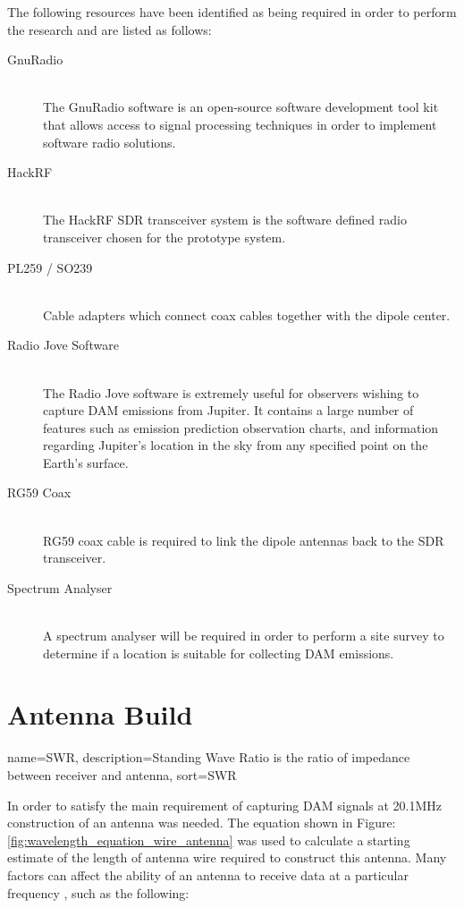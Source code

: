 \documentclass[runningheads,a4paper]{llncs}
\begin{document}
The following resources have been identified as being required in order to perform the research and are listed as follows:

\begin{description}
  \item[GnuRadio] \hfill \\
  The GnuRadio software is an open-source software development tool kit that allows access to signal processing techniques in order to implement software radio solutions.
  \item[HackRF] \hfill \\
  The HackRF \gls{SDR} transceiver system is the software defined radio transceiver chosen for the prototype system.
  \item[PL259 / SO239] \hfill \\
  Cable adapters which connect coax cables together with the dipole center.
  \item[Radio Jove Software] \hfill \\
  The Radio Jove software is extremely useful for observers wishing to capture \gls{DAM} emissions from Jupiter. It contains a large number of features such as emission prediction observation charts, and information regarding Jupiter's location in the sky from any specified point on the Earth's surface.
  \item[RG59 Coax] \hfill \\
  RG59 coax cable is required to link the dipole antennas back to the \gls{SDR} transceiver.
  \item[Spectrum Analyser] \hfill \\
  A spectrum analyser will be required in order to perform a site survey to determine if a location is suitable for collecting \gls{DAM} emissions.
\end{description}


\section*{Antenna Build}

{
  name={SWR},
  description={Standing Wave Ratio is the ratio of impedance between receiver and antenna},
  sort=SWR
}

In order to satisfy the main requirement of capturing \gls{DAM} signals at 20.1MHz construction of an antenna was needed. The equation shown in Figure: \ref{fig:wavelength_equation_wire_antenna} was used to calculate a starting estimate of the length of antenna wire required to construct this antenna. Many factors can affect the ability of an antenna to receive data at a particular frequency \citep{arrl-00}, such as the following:
\end{document}
